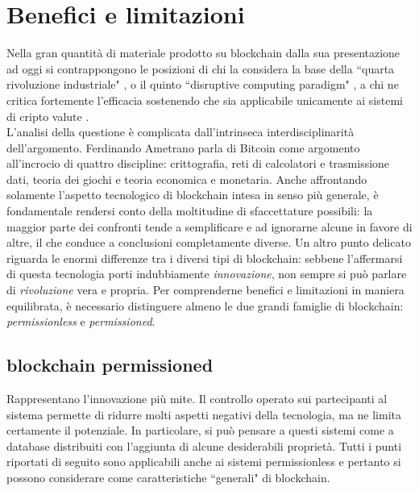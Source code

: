 \section{Benefici e limitazioni}
	Nella gran quantità di materiale prodotto su blockchain dalla sua presentazione ad oggi si contrappongono le posizioni di chi la considera la base della ``quarta rivoluzione industriale" \cite{4industrialrevo}, o il quinto ``disruptive computing paradigm" \cite{blockchain_swan}, a chi ne critica fortemente l'efficacia sostenendo che sia applicabile unicamente ai sistemi di cripto valute \cite{what_is_it_good_for}. \\
	L'analisi della questione è complicata dall'intrinseca interdisciplinarità dell'argomento. Ferdinando Ametrano parla di Bitcoin \cite{Ametrano_slides} come argomento all'incrocio di quattro discipline: crittografia, reti di calcolatori e trasmissione dati, teoria dei giochi e teoria economica e monetaria. Anche affrontando solamente l'aspetto tecnologico di blockchain intesa in senso più generale, è fondamentale rendersi conto della moltitudine di sfaccettature possibili: la maggior parte dei confronti tende a semplificare e ad ignorarne alcune in favore di altre, il che conduce a conclusioni completamente diverse. Un altro punto delicato riguarda le enormi differenze tra i diversi tipi di blockchain: sebbene l'affermarsi di questa tecnologia porti indubbiamente \emph{innovazione}, non sempre si può parlare di \emph{rivoluzione} vera e propria. Per comprenderne benefici e limitazioni in maniera equilibrata, è necessario distinguere almeno le due grandi famiglie di blockchain: \emph{permissionless} e \emph{permissioned}.
	\subsection{blockchain permissioned}
		Rappresentano l'innovazione più mite. Il controllo operato sui partecipanti al sistema permette di ridurre molti aspetti negativi della tecnologia, ma ne limita certamente il potenziale. In particolare, si può pensare a questi sistemi come a database distribuiti con l'aggiunta di alcune desiderabili proprietà. Tutti i punti riportati di seguito sono applicabili anche ai sistemi permissionless e pertanto si possono considerare come caratteristiche ``generali" di blockchain.
